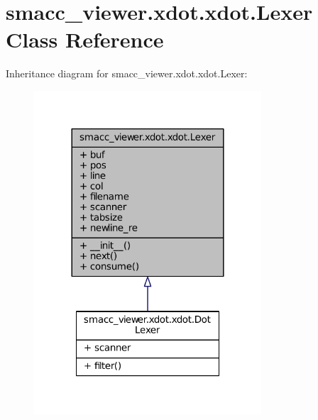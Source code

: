 \hypertarget{classsmacc__viewer_1_1xdot_1_1xdot_1_1Lexer}{}\section{smacc\+\_\+viewer.\+xdot.\+xdot.\+Lexer Class Reference}
\label{classsmacc__viewer_1_1xdot_1_1xdot_1_1Lexer}


Inheritance diagram for smacc\+\_\+viewer.\+xdot.\+xdot.\+Lexer\+:
\nopagebreak
\begin{figure}[H]
\begin{center}
\leavevmode
\includegraphics[width=240pt]{classsmacc__viewer_1_1xdot_1_1xdot_1_1Lexer__inherit__graph}
\end{center}
\end{figure}


